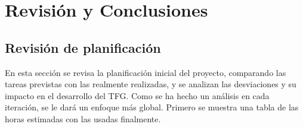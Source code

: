 
\chapter{Revisión y Conclusiones}\label{chap:revision-conclusiones}
\section{Revisión de planificación}
En esta sección se revisa la planificación inicial del proyecto, comparando las tareas previstas con las realmente realizadas, y se analizan las desviaciones y su impacto en el desarrollo del TFG. Como se ha hecho un análisis en cada iteración, se le dará un enfoque más global.
Primero se muestra una tabla de las horas estimadas con las usadas finalmente.


